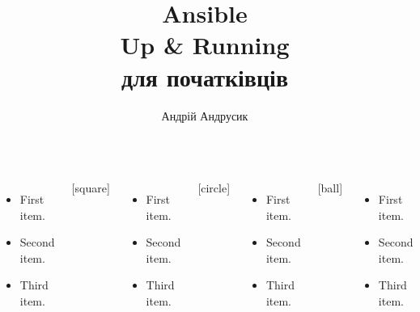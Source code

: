 \documentclass[pdf, 8pt, unicode, t]{beamer} %
\title{{\bf Ansible \\
Up \& Running}
\vspace{5mm}\\
\large для початківців
}
\author{\Large Андрій Андрусик}
\begin{document}

\begin{frame}[plain,label=title]
    \titlepage
\end{frame}
\setcounter{framenumber}{0}

\begin{frame}

\begin{columns}
  \begin{itemize}
  \item First item.
  \item Second item.
  \item Third item.
  \end{itemize}
[square]
  \begin{itemize}
  \item First item.
  \item Second item.
  \item Third item.
  \end{itemize}
[circle]
  \begin{itemize}
  \item First item.
  \item Second item.
  \item Third item.
  \end{itemize}
[ball]
  \begin{itemize}
  \item First item.
  \item Second item.
  \item Third item.
  \end{itemize}
\end{columns}

\end{frame}
\end{document}
